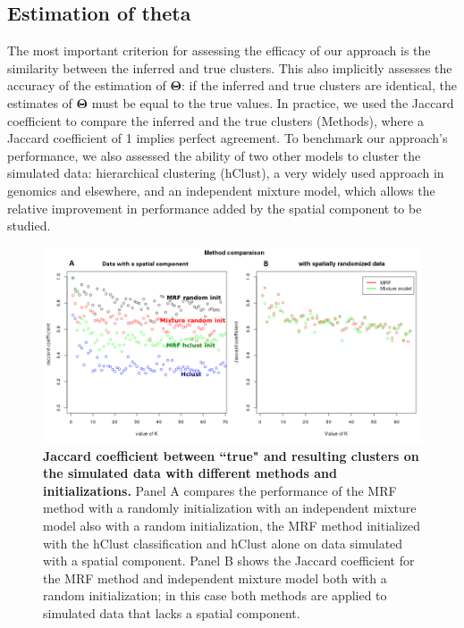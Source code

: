 	\subsection{Estimation of theta}
	The most important criterion for assessing the efficacy of our approach is the similarity between the inferred and true clusters. This also implicitly assesses the accuracy of the estimation of $\mathbf{\Theta}$: if the inferred and true clusters are identical, the estimates of $\mathbf{\Theta}$ must be equal to the true values. In practice, we used the Jaccard coefficient to compare the inferred and the true clusters (Methods), where a Jaccard coefficient of 1 implies perfect agreement. To benchmark our approach's performance, we also assessed the ability of two other models to cluster the simulated data: hierarchical clustering (hClust), a very widely used approach in genomics and elsewhere, and an independent mixture model, which allows the relative improvement in performance added by the spatial component to be studied.\\
	
		\begin{figure}[h]
\centerline{\includegraphics[width=\linewidth]{gfx/chapter5/method_comparison.png}}
\caption{{\bf Jaccard coefficient between ``true" and resulting clusters on the simulated data with different methods and initializations.} Panel A compares the performance of the MRF method with a randomly initialization with an independent mixture model also with a random initialization, the MRF method initialized with the hClust classification and hClust alone on data simulated with a spatial component. Panel B shows the Jaccard coefficient for the MRF method and independent mixture model both with a random initialization; in this case both methods are applied to simulated data that lacks a spatial component.}

\label{fig:methodComparison}
	\end{figure}
	
